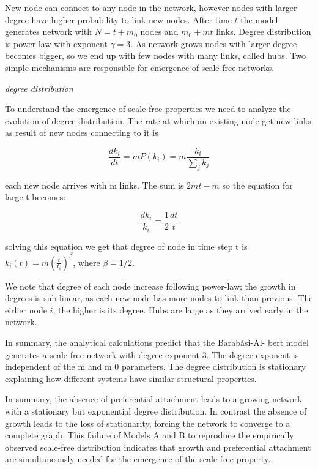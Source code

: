 New node can connect to any node in the network, however nodes with larger degree have higher probability to link new nodes. After time $t$ the model generates network with $N=t+m_0$ nodes and $m_0+mt$ links. Degree distribution is power-law with exponent $\gamma=3$. As network grows nodes with larger degree becomes bigger, so we end up with few nodes with many links, called hubs. Two simple mechanisms are responsible for emergence of scale-free networks. 

 \textit{degree distribution}
 
To understand the emergence of scale-free properties we need to analyze the evolution of degree distribution. The rate at which an existing node get new links as result of new nodes connecting to it is

\begin{equation}
\frac{dk_i}{dt} = mP(k_i) = m\frac{k_i}{\sum_jk_j}
\end{equation}

each new node arrives with m links. The sum is $2mt - m$ so the equation for large t becomes:

\begin{equation}
\frac{dk_i}{k_i} = \frac{1}{2}\frac{dt}{t}
\end{equation}

solving this equation we get that degree of node in time step t is $k_i(t)=m(\frac{t}{t_i})^\beta$, where $\beta=1/2$. 

We note that degree of each node increase following power-law; the growth in degrees is sub linear, as each new node has more nodes to link than previous. The eirlier node $i$, the higher is its degree. Hubs are large as they arrived early in the network. 

In summary, the analytical calculations predict that the Barabási-Al-
bert model generates a scale-free network with degree exponent 3. The degree exponent is independent of the m and m 0 parameters. The degree distribution is stationary explaining how different systems have similar structural properties. 

In summary, the absence of preferential attachment leads to a growing network with a stationary but exponential degree distribution. In contrast the absence of growth leads to the loss of stationarity, forcing the network to converge to a complete graph. This failure of Models A and B to reproduce the empirically observed scale-free distribution indicates that growth and
preferential attachment are simultaneously needed for the emergence of the scale-free property.


